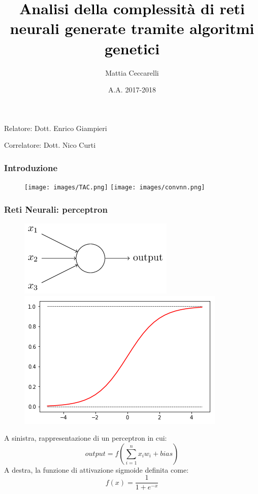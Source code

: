 \documentclass{beamer}
\begin{document}
\title{\textcolor{black}{Analisi della complessità di reti neurali generate tramite algoritmi genetici}}
\author{Mattia Ceccarelli}
\date{A.A. 2017-2018 }

\begin{frame}
 \maketitle
 Relatore: Dott. Enrico Giampieri
 
 Correlatore: Dott. Nico Curti
\end{frame}

\begin{frame}
 \frametitle{Introduzione}
 \begin{figure}
  \texttt{[image: images/TAC.png]}
  \texttt{[image: images/convnn.png]}
 \end{figure}

\end{frame}

\begin{frame}
 \frametitle{Reti Neurali: perceptron}
 \begin{figure}
   \includegraphics[scale = 0.5]{images/perceptron.png}    \includegraphics[scale = 0.35]{images/sigmoide.png}      
  \end{figure}
  A sinistra, rappresentazione di un perceptron in cui:
    \begin{equation*}
     output = f(\sum_{i = 1}^{n}x_{i}w_{i} + bias)   
    \end{equation*}
    A destra, la funzione di attivazione sigmoide definita come:  
    \begin{equation*}
      f(x) = \frac{1}{1 + e^{-x}}
    \end{equation*}
\end{frame}
\end{document}
